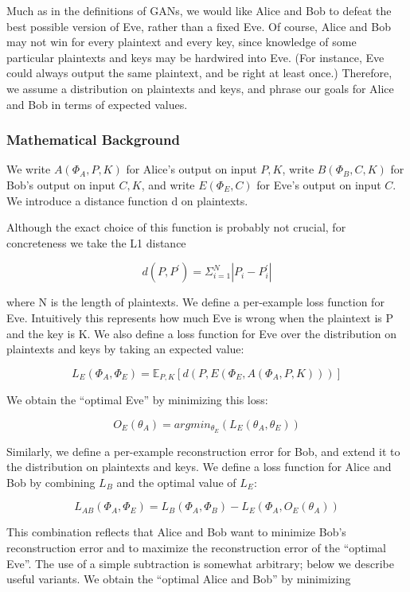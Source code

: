\documentclass[a4paper]{article}
\begin{document}
    Much as in the definitions of GANs, we would like Alice and Bob to defeat the best
    possible version of Eve, rather than a fixed Eve. Of course, Alice and Bob may not win for every
    plaintext and every key, since knowledge of some particular plaintexts and keys may be hardwired
    into Eve. (For instance, Eve could always output the same plaintext, and be right at least once.)
    Therefore, we assume a distribution on plaintexts and keys, and phrase our goals for Alice and Bob
    in terms of expected values.

      \subsubsection{Mathematical Background}
      We write $A(\Phi_{A}, P,K)$ for Alice’s output on input $P,K$, write $B(\Phi_{B},C,K)$ for Bob’s output on
      input $C,K$, and write $E(\Phi_{E},C)$ for Eve’s output on input $C$. We introduce a distance function d on
      plaintexts. 
      
      Although the exact choice of this function is probably not crucial, for concreteness we
      take the L1 distance 
        
      \[ d(P, P^\prime) = \Sigma_{i=1}^N | P_{i} - P_{i}^\prime | \]
      
      where N is the length of plaintexts. 
      We define a per-example loss function for Eve.
      Intuitively this represents how much Eve is wrong when the plaintext is P and the
      key is K. We also define a loss function for Eve over the distribution on plaintexts and keys by
      taking an expected value:

      \[ L_{E}(\Phi_{A}, \Phi_{E}) = \mathbb{E}_{P,K} [ d(P, E(\Phi_{E}, A(\Phi_{A},  P, K))) ] \]

      We obtain the “optimal Eve” by minimizing this loss:
      
      \[ O_{E}(\theta_{A}) = argmin_{\theta_{E}}(L_{E}(\theta_{A}, \theta_{E})) \]

      Similarly, we define a per-example reconstruction error for Bob, and extend it to the 
      distribution on plaintexts and keys. We define a loss function for Alice and Bob by 
      combining $L_{B}$ and the optimal value of $L_{E}$:
      
      \[ L_{AB}(\Phi_{A}, \Phi_{E}) = L_{B}(\Phi_{A}, \Phi_{B}) - L_{E}(\Phi_{A}, O_{E}(\theta_{A})) \]
      
      This combination reflects that Alice and Bob want to minimize Bob’s reconstruction error and to
      maximize the reconstruction error of the “optimal Eve”. The use of a simple subtraction is somewhat
      arbitrary; below we describe useful variants. We obtain the “optimal Alice and Bob” by minimizing
      
\end{document}
